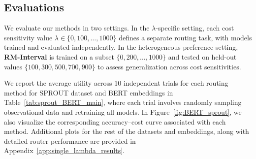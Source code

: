 \documentclass{article}
\theoremstyle{remark}
\begin{document}
\subsection{Evaluations}



We evaluate our methods in two settings. In the \(\lambda\)-specific setting, each cost sensitivity value \(\lambda \in \{0, 100, \dots, 1000\}\) defines a separate routing task, with models trained and evaluated independently. In the heterogeneous preference setting, \textbf{RM-Interval} is trained on a subset \(\{0, 200, \dots, 1000\}\) and tested on held-out values \(\{100, 300, 500, 700, 900\}\) to assess generalization across cost sensitivities.




We report the average utility across 10 independent trials for each routing method for SPROUT dataset and BERT embeddings in Table~\ref{tab:sprout_BERT_main}, where each trial involves randomly sampling observational data and retraining all models. In Figure~\ref{fig:BERT_sprout}, we also visualize the corresponding accuracy–cost curve associated with each method. Additional plots for the rest of the datasets and embeddings, along with detailed router performance %
are provided in Appendix~\ref{app:single_lambda_results}.
\end{document}

